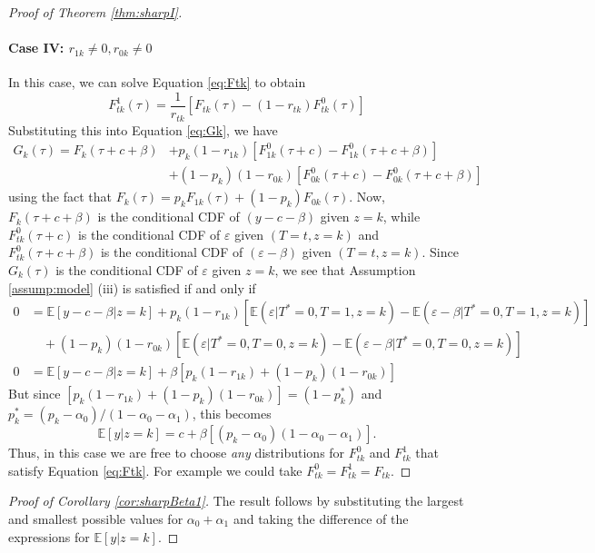 \begin{proof}[Proof of Theorem \ref{thm:sharpI}]
\paragraph{Case IV: $r_{1k}\neq 0, r_{0k} \neq 0$}
In this case, we can solve Equation \ref{eq:Ftk} to obtain
\[
  F^1_{tk}(\tau) = \frac{1}{r_{tk}}\left[F_{tk}(\tau) - (1 - r_{tk})F^0_{tk}(\tau)\right]
\]
Substituting this into Equation \ref{eq:Gk}, we have
\begin{align*}
  G_k(\tau) = F_k(\tau + c + \beta) &+ p_k(1 - r_{1k})\left[F^0_{1k}(\tau + c) - F_{1k}^0(\tau + c + \beta)\right]\\
  &+ (1 - p_k)(1 - r_{0k}) \left[ F^0_{0k}(\tau + c) - F^0_{0k}(\tau + c + \beta) \right]
\end{align*}
using the fact that $F_k(\tau) = p_k F_{1k}(\tau) + (1 - p_k) F_{0k}(\tau)$.
Now, $F_k(\tau + c + \beta)$ is the conditional CDF of $(y - c - \beta)$ given $z=k$, while $F_{tk}^0(\tau + c)$ is the conditional CDF of $\varepsilon$ given $(T = t,z =k)$ and $F^0_{tk}(\tau + c + \beta)$ is the conditional CDF of $(\varepsilon - \beta)$ given $(T = t, z=k)$.
Since $G_k(\tau)$ is the conditional CDF of $\varepsilon$ given $z=k$, we see that Assumption \ref{assump:model} (iii) is satisfied if and only if
\begin{align*}
  0 &= \mathbb{E}[y - c - \beta|z=k] + p_k(1 - r_{1k})\left[ \mathbb{E}(\varepsilon|T^*=0,T=1,z=k) - \mathbb{E}(\varepsilon - \beta|T^*=0,T=1,z=k) \right] \\
   &\quad + (1 - p_k)(1 - r_{0k})\left[ \mathbb{E}(\varepsilon|T^*=0,T=0,z=k) - \mathbb{E}(\varepsilon - \beta|T^*=0,T=0,z=k) \right]\\
   0 &= \mathbb{E}[y - c - \beta|z=k] + \beta\left[p_k(1 - r_{1k}) + (1 - p_k)(1 - r_{0k})\right]
\end{align*}
But since $\left[p_k(1 - r_{1k}) + (1 - p_k)(1 - r_{0k})\right] = (1 - p_k^*)$ and $p_k^* = (p_k - \alpha_0) /(1 - \alpha_0 - \alpha_1)$, this becomes 
\[
\mathbb{E}[y|z=k] = c + \beta\left[ (p_k - \alpha_0)(1 - \alpha_0 - \alpha_1) \right].
\]
Thus, in this case we are free to choose \emph{any} distributions for $F^{0}_{tk}$ and $F^1_{tk}$ that satisfy Equation \ref{eq:Ftk}.
For example we could take $F^0_{tk} = F^1_{tk} = F_{tk}$.
\end{proof}

\begin{proof}[Proof of Corollary \ref{cor:sharpBeta1}]
The result follows by substituting the largest and smallest possible values for $\alpha_0 + \alpha_1$ and taking the difference of the expressions for $\mathbb{E}[y|z=k]$.
\end{proof}


